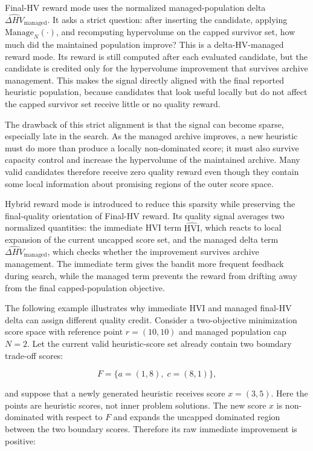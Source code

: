 Final-HV reward mode uses the normalized managed-population delta $\widehat{\Delta HV}_{\mathrm{managed}}$. It asks a strict question: after inserting the candidate, applying $\mathrm{Manage}_N(\cdot)$, and recomputing hypervolume on the capped survivor set, how much did the maintained population improve? This is a delta-HV-managed reward mode. Its reward is still computed after each evaluated candidate, but the candidate is credited only for the hypervolume improvement that survives archive management. This makes the signal directly aligned with the final reported heuristic population, because candidates that look useful locally but do not affect the capped survivor set receive little or no quality reward.

The drawback of this strict alignment is that the signal can become sparse, especially late in the search. As the managed archive improves, a new heuristic must do more than produce a locally non-dominated score; it must also survive capacity control and increase the hypervolume of the maintained archive. Many valid candidates therefore receive zero quality reward even though they contain some local information about promising regions of the outer score space.

Hybrid reward mode is introduced to reduce this sparsity while preserving the final-quality orientation of Final-HV reward. Its quality signal averages two normalized quantities: the immediate HVI term $\widehat{\mathrm{HVI}}$, which reacts to local expansion of the current uncapped score set, and the managed delta term $\widehat{\Delta HV}_{\mathrm{managed}}$, which checks whether the improvement survives archive management. The immediate term gives the bandit more frequent feedback during search, while the managed term prevents the reward from drifting away from the final capped-population objective.

The following example illustrates why immediate HVI and managed final-HV delta can assign different quality credit. Consider a two-objective minimization score space with reference point $r=(10,10)$ and managed population cap $N=2$. Let the current valid heuristic-score set already contain two boundary trade-off scores:

\begin{equation}
  F=\{a=(1,8),\; c=(8,1)\},
\end{equation}

and suppose that a newly generated heuristic receives score $x=(3,5)$. Here the points are heuristic scores, not inner problem solutions. The new score $x$ is non-dominated with respect to $F$ and expands the uncapped dominated region between the two boundary scores. Therefore its raw immediate improvement is positive:

